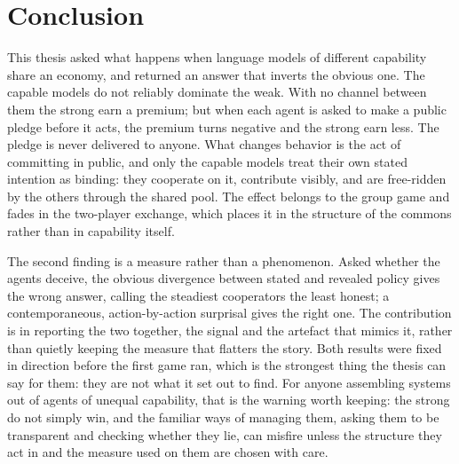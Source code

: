 \chapter{Conclusion}
\label{ch:conclusion}

This thesis asked what happens when language models of different capability share an economy, and
returned an answer that inverts the obvious one. The capable models do not reliably dominate the
weak. With no channel between them the strong earn a premium; but when each agent is asked to make
a public pledge before it acts, the premium turns negative and the strong earn less. The pledge is
never delivered to anyone. What changes behavior is the act of committing in public, and only the
capable models treat their own stated intention as binding: they cooperate on it, contribute
visibly, and are free-ridden by the others through the shared pool. The effect belongs to the group
game and fades in the two-player exchange, which places it in the structure of the commons rather
than in capability itself.

The second finding is a measure rather than a phenomenon. Asked whether the agents deceive, the
obvious divergence between stated and revealed policy gives the wrong answer, calling the steadiest
cooperators the least honest; a contemporaneous, action-by-action surprisal gives the right one. The
contribution is in reporting the two together, the signal and the artefact that mimics it, rather
than quietly keeping the measure that flatters the story. Both results were fixed in direction
before the first game ran, which is the strongest thing the thesis can say for them: they are not
what it set out to find. For anyone assembling systems out of agents of unequal capability, that is
the warning worth keeping: the strong do not simply win, and the familiar ways of managing them,
asking them to be transparent and checking whether they lie, can misfire unless the structure they
act in and the measure used on them are chosen with care.
